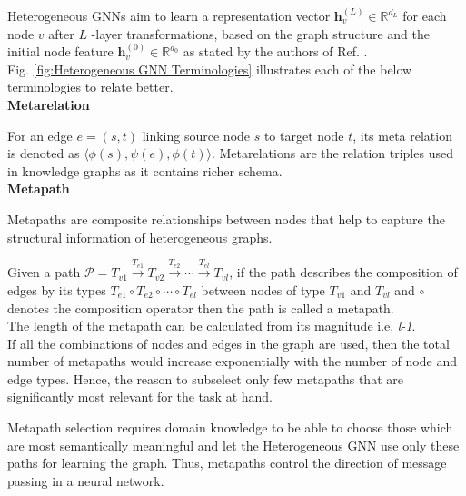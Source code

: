 \documentclass{report} %
\begin{document}
Heterogeneous \ac{GNN}s aim to learn a representation vector $\mathbf{h}^{(L)}_v \in \mathbb{R}^{d_L}$ for each node $v$ after $L$ -layer transformations, 
based on the graph structure and the initial node feature $\mathbf{h}^{(0)}_v \in \mathbb{R}^{d_0}$  as stated by the authors of Ref. \cite{REF HGNN-2021}.\\

Fig. \ref{fig:Heterogeneous GNN Terminologies} illustrates each of the below terminologies to relate better.  \\

\textbf{Metarelation}

For an edge $e = (s, t)$ linking source node $s$ to target node $t$, its meta relation is denoted as $\langle \phi(s), \psi(e), \phi(t) \rangle.$
Metarelations are the relation triples used in knowledge graphs as it contains richer schema. \\

\textbf{Metapath}

Metapaths are composite relationships between nodes that help to capture the structural information of heterogeneous graphs.

Given a path $\mathcal{P} = T_{v1} \xrightarrow{T_{e1}} T_{v2} \xrightarrow{T_{e2}} \cdots \xrightarrow{T_{el}} T_{vl}$, 
if the path describes the composition of edges by its types $T_{e1} \circ T_{e2} \circ \cdots \circ T_{el}$ between nodes of type $T_{v1}$ and $T_{vl}$ and 
$\circ$ denotes the composition operator then the path is called a metapath. \\
The length of the metapath can be calculated from its magnitude i.e, \textit{l-1}. \\
If all the combinations of nodes and edges in the graph are used, then the total number of metapaths would 
increase exponentially with the number of node and edge types. Hence, the reason to subselect only few metapaths that are significantly most relevant for the task at hand. 

Metapath selection requires domain knowledge to be able to choose those which are most semantically meaningful and let the Heterogeneous \ac{GNN} use only these paths 
for learning the graph. Thus, metapaths control the direction of message passing in a neural network.\\
\end{document}
